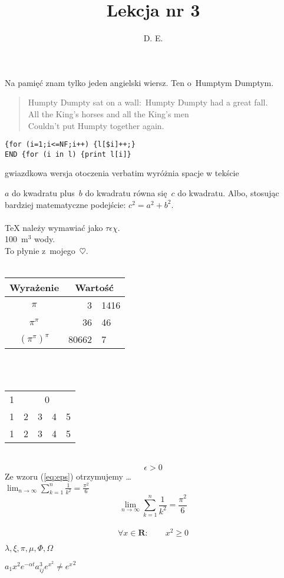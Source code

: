 \documentclass{article}
\begin{document}
\title{Lekcja nr 3}
\author{D. E.}

Na pamięć znam tylko jeden angielski wiersz. Ten o~Humptym Dumptym.
\begin{flushleft}
\begin{verse}
Humpty Dumpty sat on a wall:\
Humpty Dumpty had a great fall.\\
All the King's horses and all the King's men\\
Couldn't put Humpty together again.
\end{verse}
\end{flushleft}

\begin{verbatim}
{for (i=1;i<=NF;i++) {l[$i]++;}
END {for (i in l) {print l[i]}
\end{verbatim}

\begin{verbatim*}
gwiazdkowa wersja
otoczenia verbatim
wyróżnia spacje
w tekście
\end{verbatim*}

$a$ do kwadratu plus~$b$ do kwadratu równa się~$c$ do kwadratu. Albo, stosując bardziej matematyczne podejście: $c^{2}=a^{2}+b^{2}$.
\\ \\
{\TeX} należy wymawiać jako $\tau\epsilon\chi$.\\[6pt]
100~m$^{3}$ wody. \\[6pt]
To płynie z~mojego~$\heartsuit$.
\\ \\

\begin{tabular}{c r @{,} l}
Wyrażenie & \multicolumn{2}{c}{Wartość}\\\hline
$\pi$ & 3&1416 \\
$\pi^{\pi}$ & 36&46 \\
$(\pi^{\pi})^{\pi}$ & 80662&7 \\
\end{tabular}
\\ \\
\begin{tabular}{|c|c|c|c|l|}\hline
1 &\multicolumn{4}{c|}{0}\\
\cline{2-5}
1 & 2 & 3 & 4 &5 \\ \cline{2-4}
1 & 2 & 3 & 4 &5 \\ \hline
\end{tabular}
\\
\begin{equation}
\epsilon > 0 \label{eq:eps}
\end{equation}
Ze wzoru (\ref{eq:eps}) otrzymujemy \ldots
\\
$\lim_{n \to \infty}
\sum_{k=1}^n \frac{1}{k^2} = \frac{\pi^2}{6}$
\\
\begin{displaymath}
\lim_{n \to \infty}
\sum_{k=1}^n \frac{1}{k^2} = \frac{\pi^2}{6}
\end{displaymath}
\\
\begin{equation}
\forall x \in \mathbf{R}\colon
\qquad x^{2} \geq 0
\end{equation}

$\lambda, \xi, \pi, \mu, \Phi, \Omega$

$a_{1} x^{2} e^{-\alpha t}
a^{3}_{ij} e^{x^2} \neq {e^x}^2$
\end{document}
